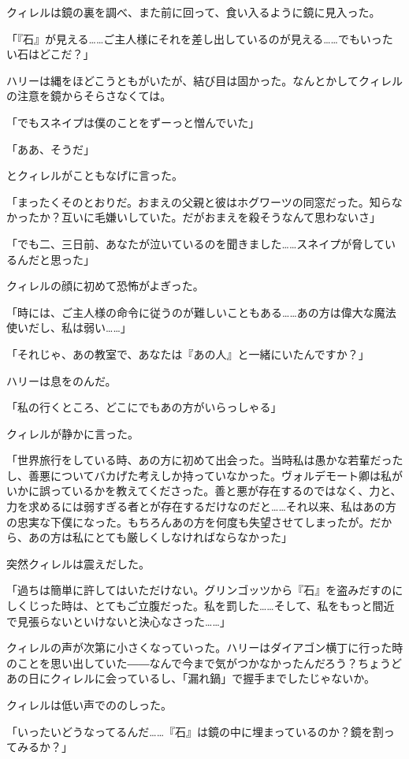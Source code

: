 \documentclass[10pt,a4paper]{article}
\begin{document}
\begin{CJK}{UTF8}{min}
クィレルは鏡の裏を調べ、また前に回って、食い入るように鏡に見入った。

「『石』が見える……ご主人様にそれを差し出しているのが見える……でもいったい石はどこだ？」

ハリーは縄をほどこうともがいたが、結び目は固かった。なんとかしてクィレルの注意を鏡からそらさなくては。

「でもスネイプは僕のことをずーっと憎んでいた」

「ああ、そうだ」

とクィレルがこともなげに言った。

「まったくそのとおりだ。おまえの父親と彼はホグワーツの同窓だった。知らなかったか？互いに毛嫌いしていた。だがおまえを殺そうなんて思わないさ」

「でも二、三日前、あなたが泣いているのを聞きました……スネイプが脅しているんだと思った」

クィレルの顔に初めて恐怖がよぎった。

「時には、ご主人様の命令に従うのが難しいこともある……あの方は偉大な魔法使いだし、私は弱い……」

「それじゃ、あの教室で、あなたは『あの人』と一緒にいたんですか？」

ハリーは息をのんだ。

「私の行くところ、どこにでもあの方がいらっしゃる」

クィレルが静かに言った。

「世界旅行をしている時、あの方に初めて出会った。当時私は愚かな若輩だったし、善悪についてバカげた考えしか持っていなかった。ヴォルデモート卿は私がいかに誤っているかを教えてくださった。善と悪が存在するのではなく、力と、力を求めるには弱すぎる者とが存在するだけなのだと……それ以来、私はあの方の忠実な下僕になった。もちろんあの方を何度も失望させてしまったが。だから、あの方は私にとても厳しくしなければならなかった」

突然クィレルは震えだした。

「過ちは簡単に許してはいただけない。グリンゴッツから『石』を盗みだすのにしくじった時は、とてもご立腹だった。私を罰した……そして、私をもっと間近で見張らないといけないと決心なさった……」

クィレルの声が次第に小さくなっていった。ハリーはダイアゴン横丁に行った時のことを思い出していた――なんで今まで気がつかなかったんだろう？ちょうどあの日にクィレルに会っているし、「漏れ鍋」で握手までしたじゃないか。

クィレルは低い声でののしった。

「いったいどうなってるんだ……『石』は鏡の中に埋まっているのか？鏡を割ってみるか？」


\end{CJK}
\end{document}
